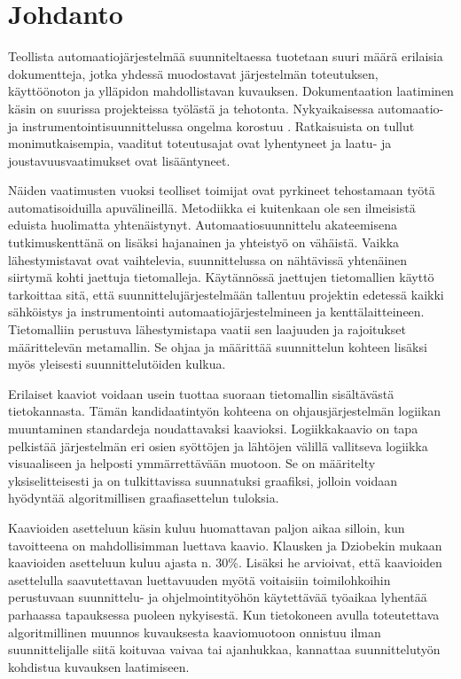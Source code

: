 \documentclass[finnish,12pt]{article}
\begin{document}
	\cleardoublepage
	\storeinipagenumber
	\setcounter{page}{1}


	\section{Johdanto}
	\thispagestyle{empty}

Teollista automaatiojärjestelmää suunniteltaessa tuotetaan suuri määrä erilaisia dokumentteja, jotka
yhdessä muodostavat järjestelmän toteutuksen, käyttöönoton ja ylläpidon mahdollistavan kuvauksen.
Dokumentaation laatiminen käsin on suurissa projekteissa työlästä ja tehotonta.
Nykyaikaisessa automaatio- ja instrumentointisuunnittelussa ongelma korostuu \cite{RefWorks:41}.
Ratkaisuista on tullut monimutkaisempia, vaaditut toteutusajat ovat lyhentyneet ja laatu- ja joustavuusvaatimukset ovat lisääntyneet.

Näiden vaatimusten vuoksi teolliset toimijat ovat pyrkineet tehostamaan työtä automatisoiduilla apuvälineillä.
Metodiikka ei kuitenkaan ole sen ilmeisistä eduista huolimatta yhtenäistynyt.
Automaatiosuunnittelu akateemisena tutkimuskenttänä on lisäksi hajanainen ja yhteistyö on vähäistä.
Vaikka lähestymistavat ovat vaihtelevia, suunnittelussa on nähtävissä yhtenäinen siirtymä kohti jaettuja tietomalleja.
Käytännössä jaettujen tietomallien käyttö tarkoittaa sitä, että suunnittelujärjestelmään tallentuu projektin edetessä kaikki sähköistys ja instrumentointi automaatiojärjestelmineen ja kenttälaitteineen.
Tietomalliin perustuva lähestymistapa vaatii sen laajuuden ja rajoitukset määrittelevän metamallin.
Se ohjaa ja määrittää suunnittelun kohteen lisäksi myös yleisesti suunnittelutöiden kulkua.

Erilaiset kaaviot voidaan usein tuottaa suoraan tietomallin sisältävästä tietokannasta.
Tämän kandidaatintyön kohteena on ohjausjärjestelmän logiikan muuntaminen standardeja noudattavaksi kaavioksi.
Logiikkakaavio on tapa pelkistää järjestelmän eri osien syöttöjen ja lähtöjen välillä vallitseva logiikka visuaaliseen ja helposti ymmärrettävään muotoon.
Se on määritelty yksiselitteisesti ja on tulkittavissa suunnatuksi graafiksi, jolloin voidaan hyödyntää algoritmillisen graafiasettelun tuloksia.

Kaavioiden asetteluun käsin kuluu huomattavan paljon aikaa silloin, kun tavoitteena on mahdollisimman luettava kaavio.
Klausken ja Dziobekin mukaan kaavioiden asetteluun kuluu ajasta n. 30\%.
Lisäksi he arvioivat, että kaavioiden asettelulla saavutettavan luettavuuden myötä voitaisiin toimilohkoihin perustuvaan suunnittelu- ja ohjelmointityöhön käytettävää työaikaa lyhentää parhaassa tapauksessa puoleen nykyisestä. \cite{Refworks:63}
Kun tietokoneen avulla toteutettava algoritmillinen muunnos kuvauksesta kaaviomuotoon onnistuu ilman suunnittelijalle siitä koituvaa vaivaa tai ajanhukkaa, kannattaa suunnittelutyön kohdistua kuvauksen laatimiseen.
\end{document}
